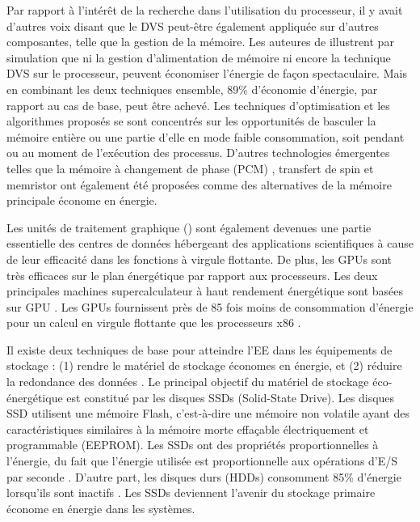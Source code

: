 Par rapport à l'intérêt de la recherche dans l'utilisation du processeur, il y avait d'autres voix disant que le DVS peut-être également appliquée sur d'autres composantes, telle que la gestion de la mémoire. Les auteures de \cite{Fan03} illustrent par simulation que ni la gestion d'alimentation de mémoire ni encore la technique DVS sur le processeur, peuvent économiser l'énergie de façon spectaculaire. Mais en combinant les deux techniques ensemble, 89\% d'économie d'énergie, par rapport au cas de base, peut être achevé. Les techniques d'optimisation et les algorithmes proposés \cite{Lebeck00,Park11,Wu12} se sont concentrés sur les opportunités de basculer la mémoire entière ou une partie d'elle en mode faible consommation, soit pendant ou au moment de l'exécution des processus. D'autres technologies émergentes telles que la mémoire à changement de phase (PCM) \cite{Zhou09}, transfert de spin \cite{Wang08} et memristor \cite{Niu10} ont également été proposées comme des alternatives de la mémoire principale économe en énergie.

Les unités de traitement graphique () sont également devenues une partie essentielle des centres de données hébergeant des applications scientifiques à cause de leur efficacité dans les fonctions à virgule flottante. De plus, les GPUs sont très efficaces sur le plan énergétique par rapport aux processeurs. Les deux principales machines supercalculateur à haut rendement énergétique sont basées sur GPU \cite{Green500}. Les GPUs fournissent près de 85 fois moins de consommation d'énergie pour un calcul en virgule flottante que les processeurs x86 \cite{Keckler11}.

Il existe deux techniques de base pour atteindre l'EE dans les équipements de stockage : (1) rendre le matériel de stockage économes en énergie, et (2) réduire la redondance des données \cite{Yoder10}. Le principal objectif du matériel de stockage éco-énergétique est constitué par les disques SSDs (Solid-State Drive). Les disques SSD utilisent une mémoire Flash, c'est-à-dire une mémoire non volatile ayant des caractéristiques similaires à la mémoire morte effaçable électriquement et programmable (EEPROM). Les SSDs ont des propriétés proportionnelles à l'énergie, du fait que l'énergie utilisée est proportionnelle aux opérations d'E/S par seconde \cite{Shuja16}. D'autre part, les disques durs (HDDs) consomment 85\% d'énergie lorsqu'ils sont inactifs \cite{Narayanan09}. Les SSDs deviennent l'avenir du stockage primaire économe en énergie dans les systèmes.

